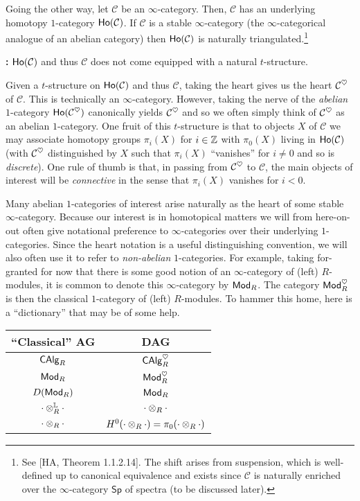 \documentclass[11pt]{article}
\renewcommand{\C}{\mathcal{C}}
\renewcommand{\Sp}{\mathsf{Sp}} %
\begin{document}
Going the other way, let $\C$ be an $\infty$-category. Then, $\C$ has an underlying homotopy $1$-category $\Ho(\C)$. If $\C$ is a stable $\infty$-category (the $\infty$-categorical analogue of an abelian category) then $\Ho(\C)$ is naturally triangulated.\footnote{See [HA, Theorem 1.1.2.14]. The shift arises from suspension, which is well-defined up to canonical equivalence and exists since $\C$ is naturally enriched over the $\infty$-category $\Sp$ of spectra (to be discussed later).}

\textbf{:} $\Ho(\C)$ and thus $\C$ does not come equipped with a natural $t$-structure.

Given a $t$-structure on $\Ho(\C)$ and thus $\C$, taking the heart gives us the heart $\C^{\heart}$ of $\C$. This is technically an $\infty$-category. However, taking the nerve of the \emph{abelian} $1$-category $\Ho(\C^{\heart})$ canonically yields $\C^{\heart}$ and so we often simply think of $\C^{\heart}$ as an abelian $1$-category. One fruit of this $t$-structure is that to objects $X$ of $\C$ we may associate homotopy groups $\pi_i(X)$ for $i\in\mathbb{Z}$ with $\pi_0(X)$ living in $\Ho(\C)$ (with $\C^{\heart}$ distinguished by $X$ such that $\pi_i(X)$ ``vanishes'' for $i\neq0$ and so is \emph{discrete}). One rule of thumb is that, in passing from $\C^{\heart}$ to $\C$, the main objects of interest will be \emph{connective} in the sense that $\pi_i(X)$ vanishes for $i<0$.

Many abelian $1$-categories of interest arise naturally as the heart of some stable $\infty$-category. Because our interest is in homotopical matters we will from here-on-out often give notational preference to $\infty$-categories over their underlying $1$-categories. Since the heart notation is a useful distinguishing convention, we will also often use it to refer to \emph{non-abelian} $1$-categories. For example, taking for-granted for now that there is some good notion of an $\infty$-category of (left) $R$-modules, it is common to denote this $\infty$-category by $\operatorname{\mathsf{Mod}}_R$. The category $\operatorname{\mathsf{Mod}}_R^{\heartsuit}$ is then the classical $1$-category of (left) $R$-modules. To hammer this home, here is a ``dictionary'' that may be of some help.

\begin{center}
\begin{tabular}{|c|c|}
\hline
``Classical'' AG & DAG \\
\hline
$\operatorname{\mathsf{CAlg}}_R$ & $\operatorname{\mathsf{CAlg}}_R^{\heartsuit}$ \\
$\operatorname{\mathsf{Mod}}_R$ & $\operatorname{\mathsf{Mod}}_R^{\heartsuit}$ \\
$D(\operatorname{\mathsf{Mod}}_R)$ & $\operatorname{\mathsf{Mod}}_R$ \\
$\cdot\otimes^{\mathbb{L}}_R\cdot$ & $\cdot\otimes_R\cdot$ \\
$\cdot\otimes_R\cdot$ & $H^0(\cdot\otimes_R\cdot)=\pi_0(\cdot\otimes_R\cdot)$ \\
\hline
\end{tabular}
\end{center}
\end{document}
